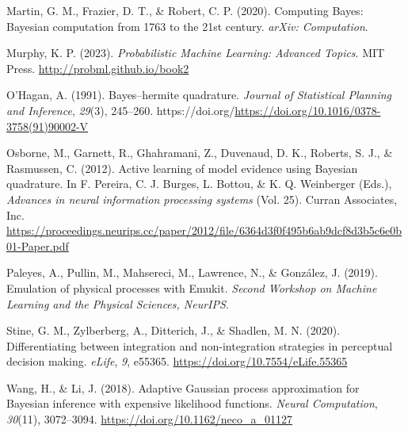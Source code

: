 \documentclass[
]{article}
\newlength{\cslhangindent}
\newlength{\cslentryspacingunit} %
\newenvironment{CSLReferences}[2] %
 {%
  \setlength{\parindent}{0pt}
  \ifodd #1
  \let\oldpar\par
  \def\par{\hangindent=\cslhangindent\oldpar}
  \fi
  \setlength{\parskip}{#2\cslentryspacingunit}
 }%
 {}
\begin{document}
\begin{CSLReferences}{1}{0}
\leavevmode{}%
Martin, G. M., Frazier, D. T., \& Robert, C. P. (2020). Computing
{Bayes}: {Bayesian} computation from 1763 to the 21st century.
\emph{arXiv: Computation}.

\leavevmode{}%
Murphy, K. P. (2023). \emph{Probabilistic {Machine} {Learning}:
{Advanced} {Topics}}. MIT Press. \url{http://probml.github.io/book2}

\leavevmode{}%
O'Hagan, A. (1991). Bayes--hermite quadrature. \emph{Journal of
Statistical Planning and Inference}, \emph{29}(3), 245--260.
https://doi.org/\url{https://doi.org/10.1016/0378-3758(91)90002-V}

\leavevmode{}%
Osborne, M., Garnett, R., Ghahramani, Z., Duvenaud, D. K., Roberts, S.
J., \& Rasmussen, C. (2012). Active learning of model evidence using
{Bayesian} quadrature. In F. Pereira, C. J. Burges, L. Bottou, \& K. Q.
Weinberger (Eds.), \emph{Advances in neural information processing
systems} (Vol. 25). Curran Associates, Inc.
\url{https://proceedings.neurips.cc/paper/2012/file/6364d3f0f495b6ab9dcf8d3b5c6e0b01-Paper.pdf}

\leavevmode{}%
Paleyes, A., Pullin, M., Mahsereci, M., Lawrence, N., \& González, J.
(2019). Emulation of physical processes with {Emukit}. \emph{Second
Workshop on Machine Learning and the Physical Sciences, NeurIPS}.

\leavevmode{}%
Stine, G. M., Zylberberg, A., Ditterich, J., \& Shadlen, M. N. (2020).
Differentiating between integration and non-integration strategies in
perceptual decision making. \emph{eLife}, \emph{9}, e55365.
\url{https://doi.org/10.7554/eLife.55365}

\leavevmode{}%
Wang, H., \& Li, J. (2018). Adaptive {Gaussian} process approximation
for {Bayesian} inference with expensive likelihood functions.
\emph{Neural Computation}, \emph{30}(11), 3072--3094.
\url{https://doi.org/10.1162/neco_a_01127}

\end{CSLReferences}
\end{document}
